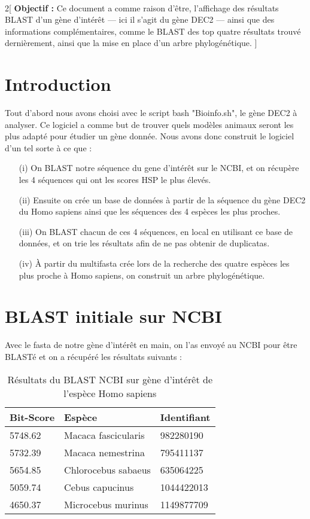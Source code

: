 \documentclass[a4paper]{article}
\begin{document}
\\

\vspace*{7mm}


\begin{multicols}{2}[
\noindent\textbf{Objectif : }Ce document a comme raison d'être, l'affichage des résultats BLAST d'un gène d'intérêt — ici il s'agit du gène DEC2 — ainsi que des informations complémentaires, comme le BLAST des top quatre résultats trouvé dernièrement, ainsi que la mise en place d'un arbre phylogénétique.
\vspace*{1mm}]

\section{Introduction}
Tout d'abord nous avons choisi avec le script bash "Bioinfo.sh", le gène DEC2 à analyser. Ce logiciel a comme but de trouver quels modèles animaux seront les plus adapté pour étudier un gène donnée. Nous avons donc construit le logiciel d'un tel sorte à ce que :
\begin{enumerate}
\item[(i)] On BLAST notre séquence du gene d'intérêt sur le NCBI, et on récupère les 4 séquences qui ont les scores HSP le plus élevés.

\item[(ii)] Ensuite on crée un base de données à partir de la séquence du gène DEC2 du Homo sapiens ainsi que les séquences des 4 espèces les plus proches.

\item[(iii)] On BLAST chacun de ces 4 séquences, en local en utilisant ce base de données, et on trie les résultats afin de ne pas obtenir de duplicatas.

\item[(iv)] À partir du multifasta crée lors de la recherche des quatre espèces les plus proche à Homo sapiens, on construit un arbre phylogénétique.
\end{enumerate}

\section{BLAST initiale sur NCBI}
Avec le fasta de notre gène d'intérêt en main, on l'as envoyé au NCBI pour être BLASTé et on a récupéré les résultats suivants :
\begin{table}[H]
\small\sf\centering
\caption{Résultats du BLAST NCBI sur gène d'intérêt de l'espèce Homo sapiens}
\begin{tabular}{lll}
\toprule
Bit-Score&Espèce&Identifiant\\
\midrule
5748.62 & Macaca fascicularis & 982280190\\
5732.39 & Macaca nemestrina & 795411137\\
5654.85 & Chlorocebus sabaeus & 635064225\\
5059.74 & Cebus capucinus & 1044422013\\
4650.37 & Microcebus murinus & 1149877709\\


\end{tabular}
\end{table}
\end{multicols}
\end{document}
